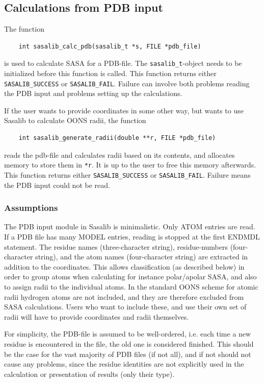 \documentclass[a4paper,11pt]{article}
\begin{document}
\subsection{Calculations from PDB input}

The function 
\begin{verbatim}
    int sasalib_calc_pdb(sasalib_t *s, FILE *pdb_file)
\end{verbatim}
is used to calculate SASA for a PDB-file. The
\texttt{sasalib\_t}-object needs to be initialized before this
function is called. This function returns either
\texttt{SASALIB\_SUCCESS} or \texttt{SASALIB\_FAIL}. Failure can
involve both problems reading the PDB input and problems setting up
the calculations.

If the user wants to provide coordinates in some other way, but wants to
use Sasalib to calculate OONS radii, the function
\begin{verbatim}
    int sasalib_generate_radii(double **r, FILE *pdb_file)
\end{verbatim}
reads the pdb-file and calculates radii based on its contents, and
allocates memory to store them in \texttt{*r}. It is up to the user to
free this memory afterwards. This function returns either
\texttt{SASALIB\_SUCCESS} or \texttt{SASALIB\_FAIL}. Failure means the
PDB input could not be read.

\subsubsection{Assumptions}

The PDB input module in Sasalib is minimalistic. Only ATOM entries are
read. If a PDB file has many MODEL entries, reading is stopped at the
first ENDMDL statement. The residue names (three-character string),
residue-numbers (four-character string), and the atom names
(four-character string) are extracted in addition to the
coordinates. This allows classification (as described below) in order
to group atoms when calculating for instance polar/apolar SASA, and
also to assign radii to the individual atoms. In the standard OONS
scheme for atomic radii hydrogen atoms are not included, and they are
therefore excluded from SASA calculations. Users who want to include
these, and use their own set of radii will have to provide coordinates
 and radii themselves.

For simplicity, the PDB-file is assumed to be well-ordered, i.e. each
time a new residue is encountered in the file, the old one is
considered finished. This should be the case for the vast majority of
PDB files (if not all), and if not should not cause any problems,
since the residue identities are not explicitly used in the
calculation or presentation of results (only their type). 
\end{document}
